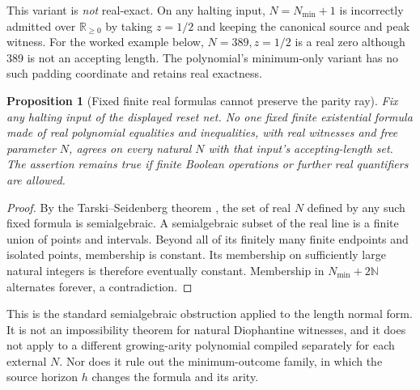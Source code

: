 \documentclass[11pt,letterpaper]{article}
\newtheorem{proposition}[theorem]{Proposition}
\theoremstyle{definition}
\theoremstyle{remark}
\newcommand{\N}{\mathbb N}
\newcommand{\Rp}{\mathbb R_{\geq0}}
\begin{document}
This variant is \emph{not} real-exact. On any halting input, $N=N_{\min}+1$ is incorrectly admitted over $\Rp$ by taking $z=1/2$ and keeping the canonical source and peak witness. For the worked example below, $N=389,z=1/2$ is a real zero although 389 is not an accepting length. The polynomial's minimum-only variant has no such padding coordinate and retains real exactness.

\begin{proposition}[Fixed finite real formulas cannot preserve the parity ray]
\label{qoc:rn:prop:realobstruction}
Fix any halting input of the displayed reset net. No one fixed finite existential formula made of real polynomial equalities and inequalities, with real witnesses and free parameter $N$, agrees on every natural $N$ with that input's accepting-length set. The assertion remains true if finite Boolean operations or further real quantifiers are allowed.
\end{proposition}
\begin{proof}
By the Tarski--Seidenberg theorem \cite{rn:tarski,rn:seidenberg}, the set of real $N$ defined by any such fixed formula is semialgebraic. A semialgebraic subset of the real line is a finite union of points and intervals. Beyond all of its finitely many finite endpoints and isolated points, membership is constant. Its membership on sufficiently large natural integers is therefore eventually constant. Membership in $N_{\min}+2\N$ alternates forever, a contradiction.
\end{proof}
This is the standard semialgebraic obstruction applied to the length normal form. It is not an impossibility theorem for natural Diophantine witnesses, and it does not apply to a different growing-arity polynomial compiled separately for each external $N$. Nor does it rule out the minimum-outcome family, in which the source horizon $h$ changes the formula and its arity.
\end{document}
